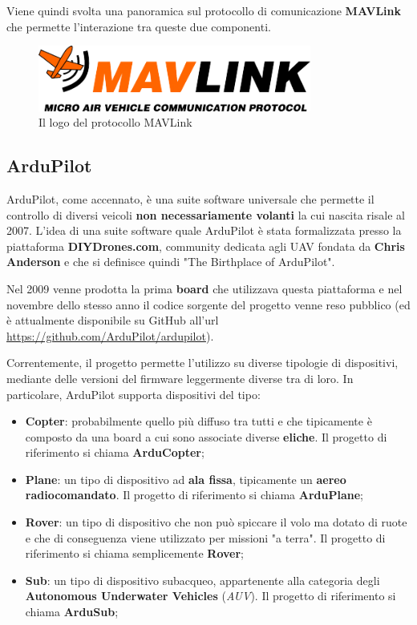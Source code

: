 \documentclass[a4paper, 12pt, oneside]{article}
\theoremstyle{definition}
\begin{document}
Viene quindi svolta una panoramica sul protocollo di comunicazione \textbf{MAVLink} che permette l'interazione tra queste due componenti.

\begin{figure}[H]
    \centering
    \includegraphics[width=0.8\textwidth]{images/logo_mavlink_small.png}
    \caption{Il logo del protocollo MAVLink}
\end{figure}

\newpage

\subsection{ArduPilot}

ArduPilot, come accennato, è una suite software universale che permette il controllo di diversi veicoli \textbf{non necessariamente volanti} \cite{ardupilot} la cui nascita risale al 2007.  L'idea di una suite software quale ArduPilot è stata formalizzata presso la piattaforma \textbf{DIYDrones.com}, community dedicata agli UAV fondata da \textbf{Chris Anderson} e che si definisce quindi "The Birthplace of ArduPilot"\cite{diy-drones}.

Nel 2009 venne prodotta la prima \textbf{board} che utilizzava questa piattaforma e nel novembre dello stesso anno il codice sorgente del progetto venne reso pubblico (ed è attualmente disponibile su GitHub all'url \url{https://github.com/ArduPilot/ardupilot})\cite{ardupilot-history}.

Correntemente, il progetto permette l'utilizzo su diverse tipologie di dispositivi, mediante delle versioni del firmware leggermente diverse tra di loro. In particolare, ArduPilot supporta dispositivi del tipo:

\begin{itemize}
    \item \textbf{Copter}: probabilmente quello più diffuso tra tutti e che tipicamente è composto da una board a cui sono associate diverse \textbf{eliche}. Il progetto di riferimento si chiama \textbf{ArduCopter}\cite{arducopter};
    \item \textbf{Plane}: un tipo di dispositivo ad \textbf{ala fissa}, tipicamente un \textbf{aereo radiocomandato}. Il progetto di riferimento si chiama \textbf{ArduPlane}\cite{arduplane};
    \item \textbf{Rover}: un tipo di dispositivo che non può spiccare il volo ma dotato di ruote e che di conseguenza viene utilizzato per missioni "a terra". Il progetto di riferimento si chiama semplicemente \textbf{Rover}\cite{rover};
    \item \textbf{Sub}: un tipo di dispositivo subacqueo, appartenente alla categoria degli \textbf{Autonomous Underwater Vehicles} (\textit{AUV}). Il progetto di riferimento si chiama \textbf{ArduSub}\cite{ardusub};
\end{itemize}
\end{document}
